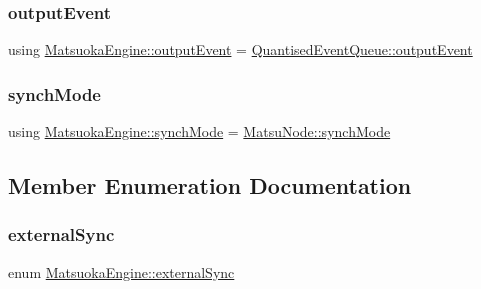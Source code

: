 \mbox{\label{classMatsuokaEngine_a09035e4918ce82c9378821c88375f843}} 
\subsubsection{\texorpdfstring{output\+Event}{outputEvent}}
{\footnotesize\ttfamily using \mbox{\hyperlink{classMatsuokaEngine_a09035e4918ce82c9378821c88375f843}{Matsuoka\+Engine\+::output\+Event}} =  \mbox{\hyperlink{structQuantisedEventQueue_1_1outputEvent}{Quantised\+Event\+Queue\+::output\+Event}}}

\mbox{\label{classMatsuokaEngine_acbf2fcb6ddd3b8edc414753248b95fc2}} 
\subsubsection{\texorpdfstring{synch\+Mode}{synchMode}}
{\footnotesize\ttfamily using \mbox{\hyperlink{classMatsuNode_a725e228db39b8842f851ddf88f640bed}{Matsuoka\+Engine\+::synch\+Mode}} =  \mbox{\hyperlink{classMatsuNode_a725e228db39b8842f851ddf88f640bed}{Matsu\+Node\+::synch\+Mode}}}



\subsection{Member Enumeration Documentation}
\mbox{\label{classMatsuokaEngine_ad8f471b2f1ca479174d5514b9a3597ec}} 
\subsubsection{\texorpdfstring{external\+Sync}{externalSync}}
{\footnotesize\ttfamily enum \mbox{\hyperlink{classMatsuokaEngine_ad8f471b2f1ca479174d5514b9a3597ec}{Matsuoka\+Engine\+::external\+Sync}}}

